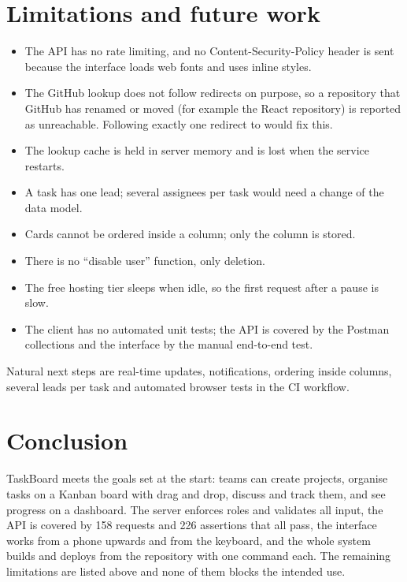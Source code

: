 \documentclass[11pt,a4paper]{article}
\begin{document}
\section{Limitations and future work}
\begin{itemize}
  \item The API has no rate limiting, and no Content-Security-Policy header is sent because the interface loads web fonts and uses inline styles.
  \item The GitHub lookup does not follow redirects on purpose, so a repository that GitHub has renamed or moved (for example the React repository) is reported as unreachable. Following exactly one redirect to  would fix this.
  \item The lookup cache is held in server memory and is lost when the service restarts.
  \item A task has one lead; several assignees per task would need a change of the data model.
  \item Cards cannot be ordered inside a column; only the column is stored.
  \item There is no ``disable user'' function, only deletion.
  \item The free hosting tier sleeps when idle, so the first request after a pause is slow.
  \item The client has no automated unit tests; the API is covered by the Postman collections and the interface by the manual end-to-end test.
\end{itemize}
Natural next steps are real-time updates, notifications, ordering inside columns, several leads per task and automated browser tests in the CI workflow.

\section{Conclusion}
TaskBoard meets the goals set at the start: teams can create projects, organise tasks on a Kanban board with drag and drop, discuss and track them, and see progress on a dashboard. The server enforces roles and validates all input, the API is covered by 158 requests and 226 assertions that all pass, the interface works from a phone upwards and from the keyboard, and the whole system builds and deploys from the repository with one command each. The remaining limitations are listed above and none of them blocks the intended use.
\end{document}
